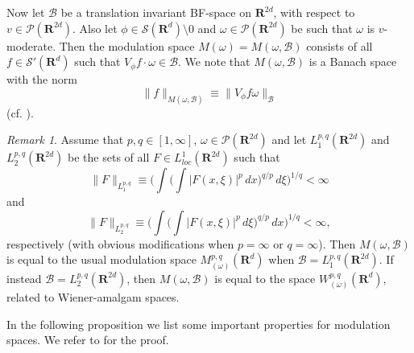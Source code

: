 \documentclass[12pt,a4paper,reqno]{amsart}
\numberwithin{equation}{section}
\numberwithin{thm}{section}
\theoremstyle{definition}
\theoremstyle{remark}
\newtheorem{rem}[thm]{Remark}
\begin{document}
\par

Now let $\mathscr{B}$ be a translation invariant BF-space on
${\mathbf R^{{2d}}}$, with respect to $v\in \mathscr P({\mathbf R^{{2d}}})$. Also let
$\phi \in \mathscr{S}({\mathbf R^{{d}}}){\setminus {0}}$ and $\omega \in
\mathscr{P}({\mathbf R^{{2d}}})$ be such that $\omega$ is $v$-moderate. Then the
modulation space $M(\omega)=M(\omega ,\mathscr B)$ consists of all $f\in
\mathscr{S}'({\mathbf R^{{d}}})$ such that $V_{\phi}f\cdot \omega \in
\mathscr{B}$. We note that $M(\omega ,\mathscr B)$ is a Banach space
with the norm
\begin{equation}\label{modnorm}
\|f\|_{M(\omega ,\mathscr B)} \equiv \|V_{\phi} f
\omega\|_{\mathscr{B}}
\end{equation}
(cf. \cite{Feichtinger3}).

\par

\begin{rem}\label{Modamalgam}
Assume that $p,q\in [1,\infty]$, $\omega\in \mathscr P ({\mathbf R^{{2d}}})$ and
let $L^{p,q}_{1}({\mathbf R^{{2d}}})$ and $L^{p,q}_{2}({\mathbf R^{{2d}}})$ be the sets of
all $F\in  L^1_{loc} ({\mathbf R^{{2d}}})$ such that
\begin{equation*}
\|F\|_{L^{p,q}_1}  \equiv \Big ( \int \Big( \int |F(x,\xi)|^p\,
dx\Big )^{q/p}\,d\xi \Big )^{1/q}
<\infty
\end{equation*}
and
\begin{equation*}
\|F\|_{L^{p,q}_2} \equiv \Big ( \int \Big ( \int |F(x,\xi)|^p\,
d\xi \Big )^{q/p}\, dx\Big )^{1/q}<\infty ,
\end{equation*}
respectively (with obvious modifications when $p=\infty$ or
$q=\infty$). Then $M(\omega ,\mathscr B)$ is equal to the usual
modulation space $M^{p,q}_{(\omega)}({\mathbf R^{{d}}})$ when
$\mathscr{B}=L^{p,q}_1({\mathbf R^{{2d}}})$. If instead
$\mathscr{B}=L^{p,q}_2({\mathbf R^{{2d}}})$, then $M(\omega ,\mathscr B)$ is
equal to the space $W^{p,q}_{(\omega)}({\mathbf R^{{d}}})$, related to
Wiener-amalgam spaces.
\end{rem}

\par

In the following proposition we list some important properties for
modulation spaces. We refer to \cite{Gro-book} for the proof.

\par
\end{document}
